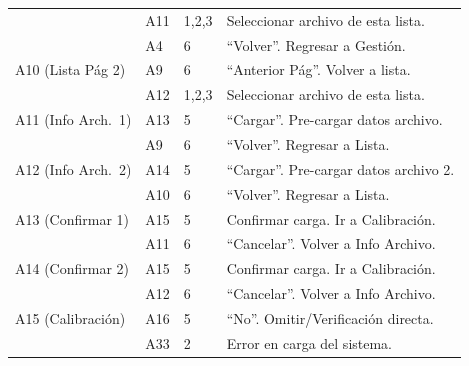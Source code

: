 \documentclass[11pt,tesis,twoside,openright,spanish]{upiiztt}
\begin{document}
\begin{longtable}{p{2.5cm}p{1.5cm}p{1.5cm}p{7cm}}
                  & A11 & 1,2,3 & Seleccionar archivo de esta lista. \\
                  & A4 & 6 & ``Volver''. Regresar a Gestión. \\
A10 (Lista Pág 2) & A9 & 6 & ``Anterior Pág''. Volver a lista. \\
                  & A12 & 1,2,3 & Seleccionar archivo de esta lista. \\
A11 (Info Arch.\ 1) & A13 & 5 & ``Cargar''. Pre-cargar datos archivo. \\
                  & A9 & 6 & ``Volver''. Regresar a Lista. \\
A12 (Info Arch.\ 2) & A14 & 5 & ``Cargar''. Pre-cargar datos archivo 2. \\
                  & A10 & 6 & ``Volver''. Regresar a Lista. \\
A13 (Confirmar 1) & A15 & 5 & Confirmar carga. Ir a Calibración. \\
                  & A11 & 6 & ``Cancelar''. Volver a Info Archivo. \\
A14 (Confirmar 2) & A15 & 5 & Confirmar carga. Ir a Calibración. \\
                  & A12 & 6 & ``Cancelar''. Volver a Info Archivo. \\
A15 (Calibración) & A16 & 5 & ``No''. Omitir/Verificación directa. \\
                  & A33 & 2 & Error en carga del sistema. \\
\end{longtable}
\end{document}
